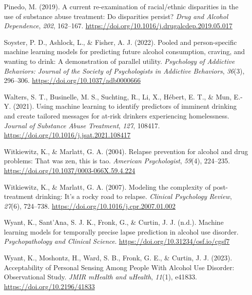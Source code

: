 \documentclass[
]{agujournal2019}
\newlength{\cslhangindent}
\newenvironment{CSLReferences}[2] %
 {\begin{list}{}{%
  \setlength{\itemindent}{0pt}
  \setlength{\leftmargin}{0pt}
  \setlength{\parsep}{0pt}
  \ifodd #1
   \setlength{\leftmargin}{\cslhangindent}
   \setlength{\itemindent}{-1\cslhangindent}
  \fi
  \setlength{\itemsep}{#2\baselineskip}}}
 {\end{list}}
\begin{document}
\begin{CSLReferences}{1}{0}
Pinedo, M. (2019). A current re-examination of racial/ethnic disparities
in the use of substance abuse treatment: {Do} disparities persist?
\emph{Drug and Alcohol Dependence}, \emph{202}, 162--167.
\url{https://doi.org/10.1016/j.drugalcdep.2019.05.017}

Soyster, P. D., Ashlock, L., \& Fisher, A. J. (2022). Pooled and
person-specific machine learning models for predicting future alcohol
consumption, craving, and wanting to drink: {A} demonstration of
parallel utility. \emph{Psychology of Addictive Behaviors: Journal of
the Society of Psychologists in Addictive Behaviors}, \emph{36}(3),
296--306. \url{https://doi.org/10.1037/adb0000666}

Walters, S. T., Businelle, M. S., Suchting, R., Li, X., Hébert, E. T.,
\& Mun, E.-Y. (2021). Using machine learning to identify predictors of
imminent drinking and create tailored messages for at-risk drinkers
experiencing homelessness. \emph{Journal of Substance Abuse Treatment},
\emph{127}, 108417. \url{https://doi.org/10.1016/j.jsat.2021.108417}

Witkiewitz, K., \& Marlatt, G. A. (2004). Relapse prevention for alcohol
and drug problems: {That} was zen, this is tao. \emph{American
Psychologist}, \emph{59}(4), 224--235.
\url{https://doi.org/10.1037/0003-066X.59.4.224}

Witkiewitz, K., \& Marlatt, G. A. (2007). Modeling the complexity of
post-treatment drinking: {It}'s a rocky road to relapse. \emph{Clinical
Psychology Review}, \emph{27}(6), 724--738.
\url{https://doi.org/10.1016/j.cpr.2007.01.002}

Wyant, K., Sant'Ana, S. J. K., Fronk, G., \& Curtin, J. J. (n.d.).
Machine learning models for temporally precise lapse prediction in
alcohol use disorder. \emph{Psychopathology and Clinical Science}.
\url{https://doi.org/10.31234/osf.io/cgsf7}

Wyant, K., Moshontz, H., Ward, S. B., Fronk, G. E., \& Curtin, J. J.
(2023). Acceptability of {Personal Sensing Among People With Alcohol Use
Disorder}: {Observational Study}. \emph{JMIR mHealth and uHealth},
\emph{11}(1), e41833. \url{https://doi.org/10.2196/41833}

\end{CSLReferences}
\end{document}

